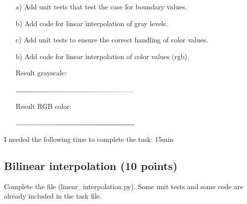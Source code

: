 \begin{enumerate}

\item[a)] Add unit tests that test the case for boundary values. 

\item[b)] Add code for linear interpolation of gray levels. 

\item[c)] Add unit tests to ensure the correct handling of color values. 

\item[b)] Add code for linear interpolation of color values (rgb). 

Result grayscale:

\includegraphics[width=0.5\textwidth]{source_code/interpolate_grayscale.png}

Result RGB color:

\includegraphics[width=0.5\textwidth]{source_code/interpolate_rgb.png}

\end{enumerate}

I needed the following time to complete the task: 15min

\subsection{Bilinear interpolation (10 points)}

Complete the file (linear\_interpolation.py). Some unit tests and some code are already included in the task file.

